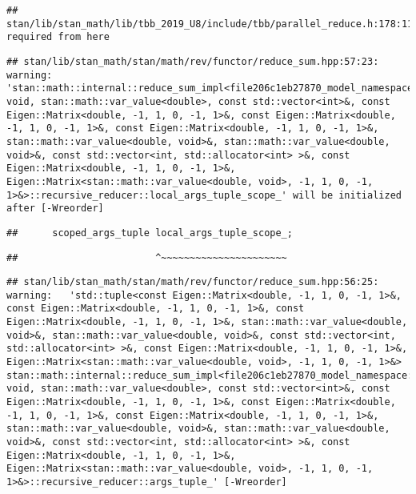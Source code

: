 \documentclass[
]{article}
\begin{document}
\begin{verbatim}
## stan/lib/stan_math/lib/tbb_2019_U8/include/tbb/parallel_reduce.h:178:11:   required from here
\end{verbatim}

\begin{verbatim}
## stan/lib/stan_math/stan/math/rev/functor/reduce_sum.hpp:57:23: warning: 'stan::math::internal::reduce_sum_impl<file206c1eb27870_model_namespace::partial_log_lik_rsfunctor__, void, stan::math::var_value<double>, const std::vector<int>&, const Eigen::Matrix<double, -1, 1, 0, -1, 1>&, const Eigen::Matrix<double, -1, 1, 0, -1, 1>&, const Eigen::Matrix<double, -1, 1, 0, -1, 1>&, stan::math::var_value<double, void>&, stan::math::var_value<double, void>&, const std::vector<int, std::allocator<int> >&, const Eigen::Matrix<double, -1, 1, 0, -1, 1>&, Eigen::Matrix<stan::math::var_value<double, void>, -1, 1, 0, -1, 1>&>::recursive_reducer::local_args_tuple_scope_' will be initialized after [-Wreorder]
\end{verbatim}

\begin{verbatim}
##      scoped_args_tuple local_args_tuple_scope_;
\end{verbatim}

\begin{verbatim}
##                        ^~~~~~~~~~~~~~~~~~~~~~~
\end{verbatim}

\begin{verbatim}
## stan/lib/stan_math/stan/math/rev/functor/reduce_sum.hpp:56:25: warning:   'std::tuple<const Eigen::Matrix<double, -1, 1, 0, -1, 1>&, const Eigen::Matrix<double, -1, 1, 0, -1, 1>&, const Eigen::Matrix<double, -1, 1, 0, -1, 1>&, stan::math::var_value<double, void>&, stan::math::var_value<double, void>&, const std::vector<int, std::allocator<int> >&, const Eigen::Matrix<double, -1, 1, 0, -1, 1>&, Eigen::Matrix<stan::math::var_value<double, void>, -1, 1, 0, -1, 1>&> stan::math::internal::reduce_sum_impl<file206c1eb27870_model_namespace::partial_log_lik_rsfunctor__, void, stan::math::var_value<double>, const std::vector<int>&, const Eigen::Matrix<double, -1, 1, 0, -1, 1>&, const Eigen::Matrix<double, -1, 1, 0, -1, 1>&, const Eigen::Matrix<double, -1, 1, 0, -1, 1>&, stan::math::var_value<double, void>&, stan::math::var_value<double, void>&, const std::vector<int, std::allocator<int> >&, const Eigen::Matrix<double, -1, 1, 0, -1, 1>&, Eigen::Matrix<stan::math::var_value<double, void>, -1, 1, 0, -1, 1>&>::recursive_reducer::args_tuple_' [-Wreorder]
\end{verbatim}
\end{document}
